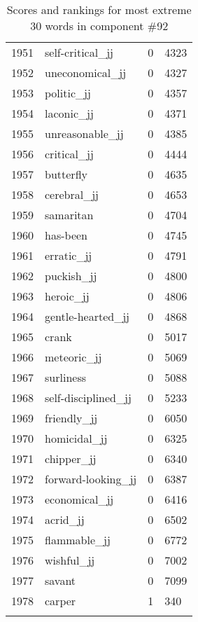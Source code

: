 \begin{longtable}[!htbp]{| rlr@{.}l |}
    1951 & self-critical\_jj & 0 & 4323 \\
    1952 & uneconomical\_jj & 0 & 4327 \\
    1953 & politic\_jj & 0 & 4357 \\
    1954 & laconic\_jj & 0 & 4371 \\
    1955 & unreasonable\_jj & 0 & 4385 \\
    1956 & critical\_jj & 0 & 4444 \\
    1957 & butterfly & 0 & 4635 \\
    1958 & cerebral\_jj & 0 & 4653 \\
    1959 & samaritan & 0 & 4704 \\
    1960 & has-been & 0 & 4745 \\
    1961 & erratic\_jj & 0 & 4791 \\
    1962 & puckish\_jj & 0 & 4800 \\
    1963 & heroic\_jj & 0 & 4806 \\
    1964 & gentle-hearted\_jj & 0 & 4868 \\
    1965 & crank & 0 & 5017 \\
    1966 & meteoric\_jj & 0 & 5069 \\
    1967 & surliness & 0 & 5088 \\
    1968 & self-disciplined\_jj & 0 & 5233 \\
    1969 & friendly\_jj & 0 & 6050 \\
    1970 & homicidal\_jj & 0 & 6325 \\
    1971 & chipper\_jj & 0 & 6340 \\
    1972 & forward-looking\_jj & 0 & 6387 \\
    1973 & economical\_jj & 0 & 6416 \\
    1974 & acrid\_jj & 0 & 6502 \\
    1975 & flammable\_jj & 0 & 6772 \\
    1976 & wishful\_jj & 0 & 7002 \\
    1977 & savant & 0 & 7099 \\
    1978 & carper & 1 & 340 \\
    \hline
    \caption{Scores and rankings for most extreme 30 words in component \#92} \\
\end{longtable}
